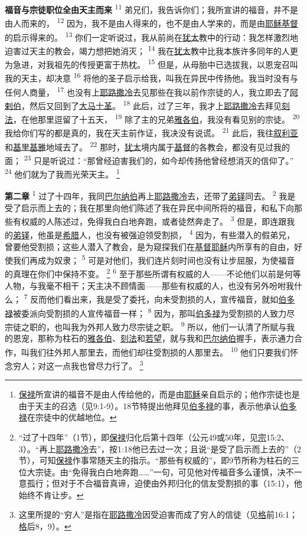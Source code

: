 \textbf{福音与宗徒职位全由天主而来\quad}
\textsuperscript{11}
弟兄们，我告诉你们；我所宣讲的福音，并不是由人而来的，
\textsuperscript{12}
因为，我不是由人得来的，也不是由人学来的，而是由\uline{耶稣}\uline{基督}的启示得来的。
\textsuperscript{13}
你们一定听说过，我从前尚在\uline{犹太}教中的行动：我怎样激烈地迫害过天主的教会，竭力想把她消灭；
\textsuperscript{14}
我在\uline{犹太}教中比我本族许多同年的人更为急进，对我祖先的传授更富于热枕。
\textsuperscript{15}
但是，从母胎中已选拔我，以恩宠召叫我的天主，却决意
\textsuperscript{16}
将他的圣子启示给我，叫我在异民中传扬他。我当时没有与任何人商量，
\textsuperscript{17}
也没有上\uline{耶路撒冷}去见那些在我以前作宗徒的人，我立即去了\uline{阿剌伯}，然后又回到了\uline{大马士革}。
\textsuperscript{18}
此后，过了三年，我才上\uline{耶路撒冷}去拜见\uline{刻法}，在他那里逗留了十五天，
\textsuperscript{19}
除了主的兄弟\uline{雅各伯}，我没有看见别的宗徒。
\textsuperscript{20}
我给你们写的都是真的，我在天主前作证，我决没有说谎。
\textsuperscript{21}
此后，我往\uline{叙利亚}和\uline{基里基雅}地域去了。
\textsuperscript{22}
那时，\uline{犹太}境内属于\uline{基督}的各教会，都没有见过我的面；
\textsuperscript{23}
只是听说过：“那曾经迫害我们的，如今却传扬他曾经想消灭的信仰了。”
\textsuperscript{24}
他们就为了我而光荣天主。
\footnote{\uline{保禄}所宣讲的福音不是由人传给他的，而是由\uline{耶稣}亲自启示的；他作宗徒也是由于天主的召选（见9:1-9）。18节特提出他拜见\uline{伯多禄}的事，表示他承认\uline{伯多禄}在宗徒中的优越地位。}

\textbf{第二章\quad}
\textsuperscript{1}
过了十四年，我同\uline{巴尔纳伯}再上\uline{耶路撒冷}去，还带了\uline{弟铎}同去。
\textsuperscript{2}
我是受了启示而上去的；我在那里向他们陈述了我在异民中间所将的福音，和私下向那些有权威的人陈述过，免得我白白地奔跑，或者徒然奔走了。
\textsuperscript{3}
但是，即连跟我的\uline{弟铎}，他虽是\uline{希腊}人，也没有被强迫领受割损，
\textsuperscript{4}
因为，有些潜入的假弟兄，曾要他受割损；这些人潜入了教会，是为窥探我们在\uline{基督}\uline{耶稣}内所享有的自由，好使我们再成为奴隶；
\textsuperscript{5}
可是对他们，我们连片刻时间也没有让步屈服，为使福音的真理在你们中保持不变。
\footnote{“过了十四年”（1节），即\uline{保禄}归化后第十四年（公元49或50年，见\uline{宗}15:2、3）。“再上\uline{耶路撒冷}去”，按1:18他已去过一次；且说“是受了启示而上去的”（2节），可知\uline{保禄}作事常随天主的指示。“那些有权威的”，即9节所称为柱石的三位大宗徒。由“免得我白白地奔跑……”一句，可见他对传福音多么谨慎，决不一意孤行；但对于不合福音真谛，迫使由外邦归化的信友受割损的事（15:1），他始终不肯让步。}
\textsuperscript{6}
至于那些所谓有权威的人——不论他们以前是何等人物，与我毫不相干；天主决不顾情面——那些有权威的人，也没有另外吩咐我什么；
\textsuperscript{7}
反而他们看出来，我是受了委托，向未受割损的人，宣传福音，就如\uline{伯多禄}被委派向受割损的人宣传福音一样；
\textsuperscript{8}
因为，那叫\uline{伯多禄}为受割损的人致力尽宗徒之职的，也叫我为外邦人致力尽宗徒之职。
\textsuperscript{9}
所以，他们一认清了所赋与我的恩宠，那称为柱石的\uline{雅各伯}、\uline{刻法}和\uline{若望}，就与我和\uline{巴尔纳伯}握手，表示通力合作，叫我们往外邦人那里去，而他们却往受割损的人那里去。
\textsuperscript{10}
他们只要我们怀念穷人；对这一点我也曾尽力行了。
\footnote{这里所提的“穷人”是指在\uline{耶路撒冷}因受迫害而成了穷人的信徒（见\uline{格}前16:1；\uline{格}后8，9）。}

